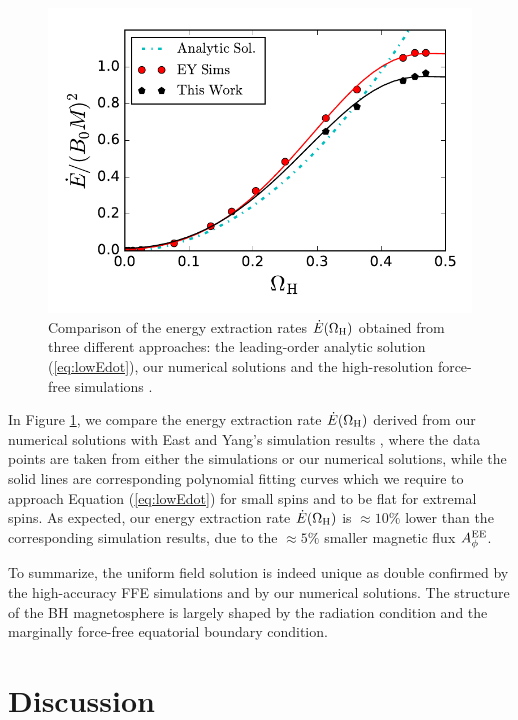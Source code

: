 \documentclass[aps,prd,reprint,nofootinbib, superscriptaddress]{revtex4-1}
\def\WH{\Omega_{\rm H}}
\def\AEE{A_\phi^{\rm EE}}
\begin{document}
\begin{figure}
\includegraphics[scale=0.7]{f3}
\caption{\label{fig:Edot} Comparison of the energy extraction rates $\dot E(\WH)$ obtained from
three different approaches: the leading-order analytic solution (\ref{eq:lowEdot}),
our numerical solutions and  the high-resolution force-free simulations \cite{East2018}.}
\end{figure}

In Figure \ref{fig:Edot}, we compare the energy extraction rate $\dot E(\WH)$
derived from our numerical solutions with East and Yang's simulation results
\cite{East2018}, where the data points are taken from either the simulations
or our numerical solutions, while the solid lines are corresponding polynomial
fitting curves which we require to approach Equation (\ref{eq:lowEdot}) for small
spins and to be flat for extremal spins. As expected, our energy extraction
rate $\dot E(\WH)$ is $\approx 10\%$ lower than the corresponding simulation results,
due to the $\approx 5\%$ smaller magnetic flux $\AEE$.

To summarize, the uniform field solution is indeed unique as double confirmed by the high-accuracy FFE
simulations and by our numerical solutions. The  structure of the BH magnetosphere
is largely shaped by the radiation condition and the marginally force-free
equatorial boundary condition.

\section{Discussion}
\label{sec:discussion}
\end{document}

